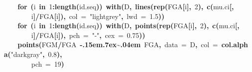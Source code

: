 \documentclass{article}
\makeatletter
\newcommand{\hlnumber}[1]{\textcolor[rgb]{0,0,0}{#1}}%
\newcommand{\hlfunctioncall}[1]{\textcolor[rgb]{.5,0,.33}{\textbf{#1}}}%
\newcommand{\hlstring}[1]{\textcolor[rgb]{.6,.6,1}{#1}}%
\newcommand{\hlkeyword}[1]{\textbf{#1}}%
\newcommand{\hlargument}[1]{\textcolor[rgb]{.69,.25,.02}{#1}}%
\newcommand{\hlsymbol}[1]{#1}%
\def\urltilda{\kern -.15em\lower .7ex\hbox{\~{}}\kern .04em}%
\newcommand{\hlstd}[1]{\textcolor[rgb]{0,0,0}{#1}}%
\newenvironment{kframe}{%
 \def\FrameCommand##1{\hskip\@totalleftmargin \hskip-\fboxsep
 \colorbox{shadecolor}{##1}\hskip-\fboxsep
     \hskip-\linewidth \hskip-\@totalleftmargin \hskip\columnwidth}%
 \MakeFramed {\advance\hsize-\width
   \@totalleftmargin\z@ \linewidth\hsize
   \@setminipage}}%
 {\par\unskip\endMakeFramed}
\newenvironment{knitrout}{}{} %
\makeatother
\begin{document}
\begin{knitrout}
{\begin{kframe}
\begin{flushleft}
\hlstd{}{\ }{\ }{\ }{\ }\hlkeyword{for}{\ }\hlkeyword{(}\hlsymbol{i}{\ }\hlkeyword{in}{\ }\hlnumber{1}\hlkeyword{:}\hlfunctioncall{length}\hlkeyword{(}\hlsymbol{id.seq}\hlkeyword{)}\hlkeyword{)}{\ }\hlfunctioncall{with}\hlkeyword{(}\hlsymbol{D}\hlkeyword{,}{\ }\hlfunctioncall{lines}\hlkeyword{(}\hlfunctioncall{rep}\hlkeyword{(}\hlsymbol{FGA}\hlkeyword{[}\hlsymbol{i}\hlkeyword{]}\hlkeyword{,}{\ }\hlnumber{2}\hlkeyword{)}\hlkeyword{,}{\ }\hlfunctioncall{c}\hlkeyword{(}\hlsymbol{mu.ci}\hlkeyword{[}\hlkeyword{,}\hspace*{\fill}\\
\hlstd{}{\ }{\ }{\ }{\ }{\ }{\ }{\ }{\ }\hlsymbol{i}\hlkeyword{]}\hlkeyword{/}\hlsymbol{FGA}\hlkeyword{[}\hlsymbol{i}\hlkeyword{]}\hlkeyword{)}\hlkeyword{,}{\ }\hlargument{col}{\ }\hlargument{=}{\ }\hlstring{"lightgrey"}\hlkeyword{,}{\ }\hlargument{lwd}{\ }\hlargument{=}{\ }\hlnumber{1.5}\hlkeyword{)}\hlkeyword{)}\hspace*{\fill}\\
\hlstd{}{\ }{\ }{\ }{\ }\hlkeyword{for}{\ }\hlkeyword{(}\hlsymbol{i}{\ }\hlkeyword{in}{\ }\hlnumber{1}\hlkeyword{:}\hlfunctioncall{length}\hlkeyword{(}\hlsymbol{id.seq}\hlkeyword{)}\hlkeyword{)}{\ }\hlfunctioncall{with}\hlkeyword{(}\hlsymbol{D}\hlkeyword{,}{\ }\hlfunctioncall{points}\hlkeyword{(}\hlfunctioncall{rep}\hlkeyword{(}\hlsymbol{FGA}\hlkeyword{[}\hlsymbol{i}\hlkeyword{]}\hlkeyword{,}{\ }\hlnumber{2}\hlkeyword{)}\hlkeyword{,}{\ }\hlfunctioncall{c}\hlkeyword{(}\hlsymbol{mu.ci}\hlkeyword{[}\hlkeyword{,}\hspace*{\fill}\\
\hlstd{}{\ }{\ }{\ }{\ }{\ }{\ }{\ }{\ }\hlsymbol{i}\hlkeyword{]}\hlkeyword{/}\hlsymbol{FGA}\hlkeyword{[}\hlsymbol{i}\hlkeyword{]}\hlkeyword{)}\hlkeyword{,}{\ }\hlargument{pch}{\ }\hlargument{=}{\ }\hlstring{"-"}\hlkeyword{,}{\ }\hlargument{cex}{\ }\hlargument{=}{\ }\hlnumber{0.75}\hlkeyword{)}\hlkeyword{)}\hspace*{\fill}\\
\hlstd{}{\ }{\ }{\ }{\ }\hlfunctioncall{points}\hlkeyword{(}\hlsymbol{FGM}\hlkeyword{/}\hlsymbol{FGA}{\ }\hlkeyword{\urltilda{}}{\ }\hlsymbol{FGA}\hlkeyword{,}{\ }\hlargument{data}{\ }\hlargument{=}{\ }\hlsymbol{D}\hlkeyword{,}{\ }\hlargument{col}{\ }\hlargument{=}{\ }\hlfunctioncall{col.alpha}\hlkeyword{(}\hlstring{"darkgray"}\hlkeyword{,}{\ }\hlnumber{0.8}\hlkeyword{)}\hlkeyword{,}\hspace*{\fill}\\
\hlstd{}{\ }{\ }{\ }{\ }{\ }{\ }{\ }{\ }\hlargument{pch}{\ }\hlargument{=}{\ }\hlnumber{19}\hlkeyword{)}\hspace*{\fill}\\

\end{flushleft}
\end{kframe}}
\end{knitrout}
\end{document}
